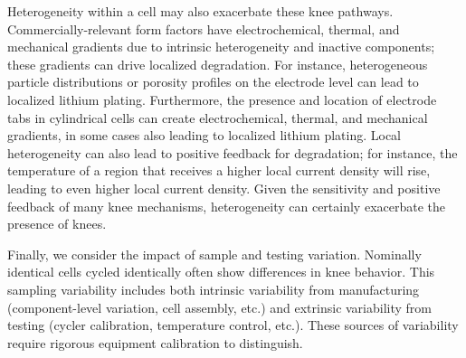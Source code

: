 \documentclass[journal=jpclcd,manuscript=article]{achemso}
\begin{document}
Heterogeneity within a cell may also exacerbate these knee pathways. Commercially-relevant form factors have electrochemical, thermal, and mechanical gradients due to intrinsic heterogeneity and inactive components; these gradients can drive localized degradation. For instance, heterogeneous particle distributions or porosity profiles on the electrode level can lead to localized lithium plating\cite{chung_particle_2014}. Furthermore, the presence and location of electrode tabs in cylindrical cells can create electrochemical, thermal, and mechanical gradients\cite{lee_three_2013, reimers_accurate_2014, senyshyn_homogeneity_2015, waldmann_influence_2015, waldmann_influence_2016, bach_nonlinear_2016, carter_detection_2019, yao_tab_2019, pfrang_geometrical_2019, li_optimal_2021}, in some cases also leading to localized lithium plating\cite{bach_nonlinear_2016, coron_impact_2020}. Local heterogeneity can also lead to positive feedback for degradation; for instance, the temperature of a region that receives a higher local current density will rise, leading to even higher local current density. Given the sensitivity and positive feedback of many knee mechanisms, heterogeneity can certainly exacerbate the presence of knees.

Finally, we consider the impact of sample and testing variation. Nominally identical cells cycled identically often show differences in knee behavior. This sampling variability includes both intrinsic variability from manufacturing (component-level variation, cell assembly, etc.) and extrinsic variability from testing (cycler calibration, temperature control, etc.). These sources of variability require rigorous equipment calibration to distinguish.
\end{document}
